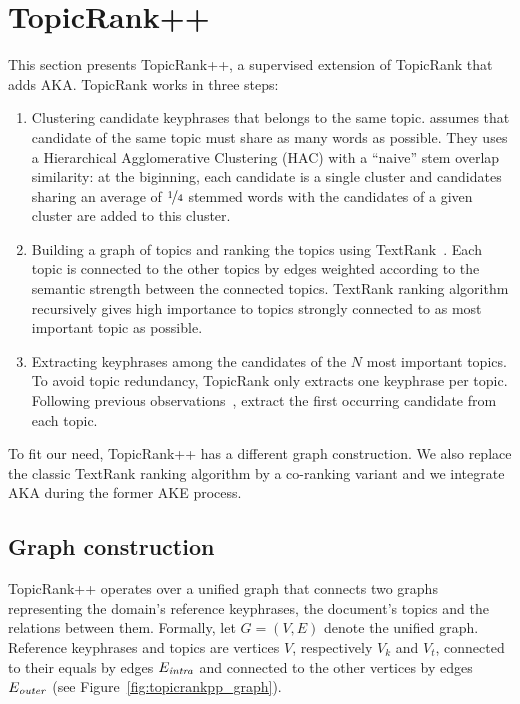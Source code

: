 \section{TopicRank++}
\label{sec:topicrankpp}
  This section presents TopicRank++, a supervised extension of TopicRank that
  adds AKA. Topic\-Rank works in three steps:
  \begin{enumerate}
    \item{Clustering candidate keyphrases that belongs to the same topic.
           assumes that candidate of the same
          topic must share as many words as possible. They uses a Hierarchical
          Agglomerative Clustering (HAC) with a ``naive'' stem overlap
          similarity: at the biginning, each candidate is a single cluster and
          candidates sharing an average of $\unitfrac{1}{4}$ stemmed words with
          the candidates of a given cluster are added to this cluster.}
    \item{Building a graph of topics and ranking the topics using
          TextRank~\cite{mihalcea2004textrank}. Each topic is connected to the
          other topics by edges weighted according to the semantic strength
          between the connected topics. TextRank ranking algorithm recursively
          gives high importance to topics strongly connected to as most
          important topic as possible.}
    \item{Extracting keyphrases among the candidates of the $N$ most important
          topics. To avoid topic redundancy, TopicRank only extracts one
          keyphrase per topic. Following previous
          observations~\cite{witten1999kea}, 
          extract the first occurring candidate from each topic.}
  \end{enumerate}

  To fit our need, TopicRank++ has a different graph construction. We also
  replace the classic TextRank ranking algorithm by a co-ranking variant and
  we integrate AKA during the former AKE process.

  \subsection{Graph construction}
  \label{subsec:graph_construction}
    TopicRank++ operates over a unified graph that connects two graphs
    representing the domain's reference keyphrases, the document's topics and
    the relations between them. Formally, let $G = (V, E)$ denote the unified
    graph. Reference keyphrases and topics are vertices $V$, respectively $V_k$
    and $V_t$, connected to their equals by edges
    $E_\textnormal{\textit{intra}}$ and connected to the other vertices by edges
    $E_\textnormal{\textit{outer}}$ (see Figure~\ref{fig:topicrankpp_graph}).

